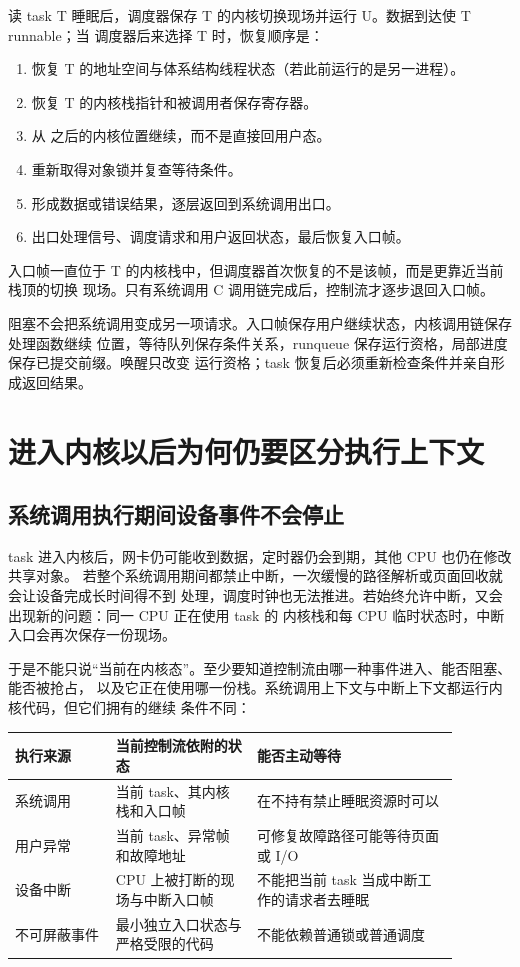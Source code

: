 读 task T 睡眠后，调度器保存 T 的内核切换现场并运行 U。数据到达使 T runnable；当
调度器后来选择 T 时，恢复顺序是：

\begin{enumerate}
\tightlist
\item 恢复 T 的地址空间与体系结构线程状态（若此前运行的是另一进程）。
\item 恢复 T 的内核栈指针和被调用者保存寄存器。
\item 从  之后的内核位置继续，而不是直接回用户态。
\item 重新取得对象锁并复查等待条件。
\item 形成数据或错误结果，逐层返回到系统调用出口。
\item 出口处理信号、调度请求和用户返回状态，最后恢复入口帧。
\end{enumerate}

入口帧一直位于 T 的内核栈中，但调度器首次恢复的不是该帧，而是更靠近当前栈顶的切换
现场。只有系统调用 C 调用链完成后，控制流才逐步退回入口帧。

\begin{keyidea}
阻塞不会把系统调用变成另一项请求。入口帧保存用户继续状态，内核调用链保存处理函数继续
位置，等待队列保存条件关系，runqueue 保存运行资格，局部进度保存已提交前缀。唤醒只改变
运行资格；task 恢复后必须重新检查条件并亲自形成返回结果。
\end{keyidea}

\section{进入内核以后为何仍要区分执行上下文}

\subsection{系统调用执行期间设备事件不会停止}

task 进入内核后，网卡仍可能收到数据，定时器仍会到期，其他 CPU 也仍在修改共享对象。
若整个系统调用期间都禁止中断，一次缓慢的路径解析或页面回收就会让设备完成长时间得不到
处理，调度时钟也无法推进。若始终允许中断，又会出现新的问题：同一 CPU 正在使用 task 的
内核栈和每 CPU 临时状态时，中断入口会再次保存一份现场。

于是不能只说“当前在内核态”。至少要知道控制流由哪一种事件进入、能否阻塞、能否被抢占，
以及它正在使用哪一份栈。系统调用上下文与中断上下文都运行内核代码，但它们拥有的继续
条件不同：

\begin{longtable}{|L{0.20\linewidth}|L{0.28\linewidth}|L{0.40\linewidth}|}
\hline
执行来源 & 当前控制流依附的状态 & 能否主动等待 \\ \hline
系统调用 & 当前 task、其内核栈和入口帧 & 在不持有禁止睡眠资源时可以 \\ \hline
用户异常 & 当前 task、异常帧和故障地址 & 可修复故障路径可能等待页面或 I/O \\ \hline
设备中断 & CPU 上被打断的现场与中断入口帧 & 不能把当前 task 当成中断工作的请求者去睡眠 \\ \hline
不可屏蔽事件 & 最小独立入口状态与严格受限的代码 & 不能依赖普通锁或普通调度 \\ \hline
\end{longtable}

